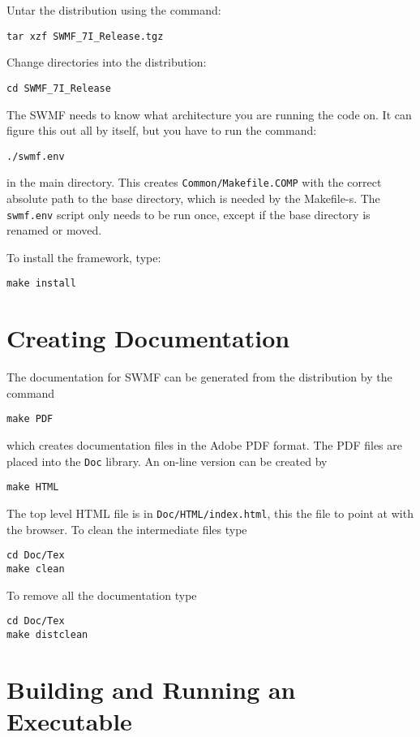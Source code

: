 Untar the distribution using the command:
\begin{verbatim}
tar xzf SWMF_7I_Release.tgz
\end{verbatim}

Change directories into the distribution:
\begin{verbatim}
cd SWMF_7I_Release
\end{verbatim}

The SWMF needs to know what architecture you are running the code on.
It can figure this out all by itself, but you have to run the command:
\begin{verbatim}
./swmf.env
\end{verbatim}
in the main directory. This creates {\tt Common/Makefile.COMP} with
the correct absolute path to the base directory, which is needed by
the Makefile-s.  The {\tt swmf.env} script only needs to be run once,
except if the base directory is renamed or moved.

To install the framework, type:
\begin{verbatim}
make install
\end{verbatim} 

\section{Creating Documentation}

The documentation for SWMF can be generated from the distribution by
the command
\begin{verbatim}
make PDF
\end{verbatim}
which creates documentation files in the Adobe PDF format.  The PDF
files are placed into the {\tt Doc} library.  An on-line version can
be created by
\begin{verbatim}
make HTML
\end{verbatim}
The top level HTML file is in {\tt Doc/HTML/index.html}, this the file
to point at with the browser.  To clean the intermediate files type
\begin{verbatim}
cd Doc/Tex
make clean
\end{verbatim}
To remove all the documentation type
\begin{verbatim}
cd Doc/Tex
make distclean
\end{verbatim}

\section{Building and Running an Executable}

